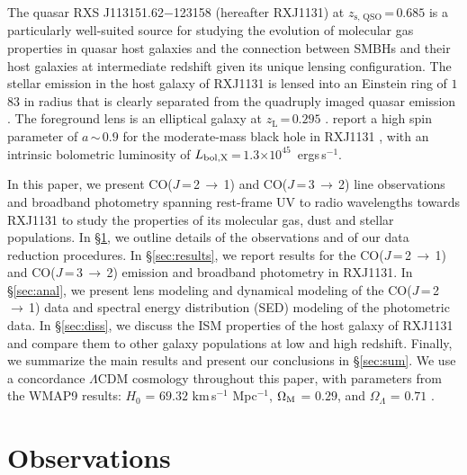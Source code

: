 \documentclass[]{emulateapj}
\newcommand{\Msun}{\mbox{$M_{\odot}$}\xspace}
\newcommand{\rarr}{$\rightarrow$}
\newcommand{\bco}{\mbox{CO($J$\,=\,2\,\rarr\,1)}\xspace}
\newcommand{\cco}{\mbox{CO($J$\,=\,3\,\rarr\,2)}\xspace}
\newcommand{\kms}{\mbox{km\,s$^{-1}$}\xspace}
\newcommand{\pmOne}{\mbox{$^{-1}$}\xspace}
\newcommand{\E}[1]{\mbox{$\times10^{#1}$}}
\newcommand{\eq}{\,=\,}
\newcommand{\Sec}[1]{\S\ref{sec:#1}}
\begin{document}
The quasar RXS J113151.62$-$123158 (hereafter RXJ1131)
at $z_\textrm{s, QSO}$\eq$0.685$ \citep[hereafter S03]{Sluse03a} is a particularly well-suited source for
studying the evolution of molecular gas properties in quasar host galaxies and the
connection between SMBHs and their host galaxies at intermediate redshift
given its unique lensing configuration.
The stellar emission in the host galaxy of RXJ1131 is lensed into
an Einstein ring of $1$\farcs$83$ in radius
that is clearly separated from the quadruply imaged quasar emission \citep[hereafter C06]{Claeskens06a}.
The foreground lens is an elliptical galaxy at $z_\textrm{L}$\eq$0.295$ .
\citet[][]{Reis14a} report a high spin parameter of $a$\,$\sim$\,$0.9$ for the moderate-mass black hole in RXJ1131 \citep[$M_{\rm BH}$\eq$8$\E{7}\Msun;][]{Sluse12a},
with an intrinsic bolometric luminosity of $L_{\rm bol, X}$\eq$1.3$\E{45}\, ergs\,s\pmOne \citep{Pooley07a}.

In this paper, we present \bco and \cco line observations and
broadband photometry spanning rest-frame UV to radio wavelengths towards RXJ1131 to
study the properties of its molecular gas, dust and stellar populations.
In \Sec{obs}, we outline details of the observations and of our data reduction procedures.
In \Sec{results}, we report results for the \bco and \cco emission and broadband
photometry in RXJ1131.
In \Sec{anal}, we present lens modeling and dynamical modeling of the \bco data and
spectral energy distribution (SED) modeling of the photometric data.
In \Sec{diss}, we discuss
the ISM properties of the host galaxy of RXJ1131 and compare
them to other galaxy populations at low and high redshift.
Finally, we summarize the main results and present our conclusions in \Sec{sum}.
We use a concordance $\Lambda$CDM cosmology throughout this paper, with
parameters from the WMAP9 results:
$H_0$ = $69.32$ \kms Mpc\pmOne, $\Omega_{\rm M}$ = $0.29$, and
$\Omega_{\Lambda}$ = $0.71$ \citep{Hinshaw13a}.

\section{Observations} \label{sec:obs}
\end{document}
